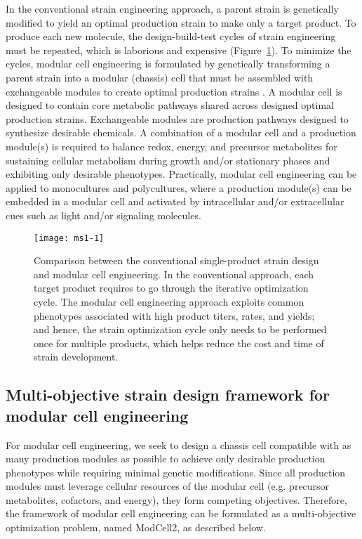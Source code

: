 In the conventional strain engineering approach, a parent strain is genetically modified to yield an optimal production strain to make only a target product.
To produce each new molecule, the design-build-test cycles of strain engineering must be repeated, which is laborious and expensive (Figure~\ref{fig:ms1-fig1}).
To minimize the cycles, modular cell engineering is formulated by genetically transforming a parent strain into a modular (chassis) cell that must be assembled with exchangeable modules to create optimal production strains \citep{trinh2015}.
A modular cell is designed to contain core metabolic pathways shared across designed optimal production strains.
Exchangeable modules are production pathways designed to synthesize desirable chemicals.
A combination of a modular cell and a production module(s) is required to balance redox, energy, and precursor metabolites for sustaining cellular metabolism during growth and/or stationary phases and exhibiting only desirable phenotypes.
Practically, modular cell engineering can be applied to monocultures and polycultures, where a production module(s) can be embedded in a modular cell and activated by intracellular and/or extracellular cues such as light and/or signaling molecules.

\begin{figure}[h]
  \centering
  \texttt{[image: ms1-1]}
    \caption[Comparison between the conventional single-product strain design and modular cell engineering]{
Comparison between the conventional single-product
strain design and modular cell engineering. In the conventional
approach, each target product requires to go through the iterative
optimization cycle. The modular cell engineering approach exploits
common phenotypes associated with high product titers, rates, and
yields; and hence, the strain optimization cycle only needs to be
performed once for multiple products, which helps reduce the cost and
time of strain development.
    }
    \label{fig:ms1-fig1}
\end{figure}

\subsection{Multi-objective strain design framework for modular cell engineering}

For modular cell engineering, we seek to design a chassis cell compatible with as many production modules as possible to achieve only desirable production phenotypes while requiring minimal genetic modifications.
Since all production modules must leverage cellular resources of the modular cell (e.g.
precursor metabolites, cofactors, and energy), they form competing objectives.
Therefore, the framework of modular cell engineering can be formulated as a multi-objective optimization problem, named ModCell2, as described below.

